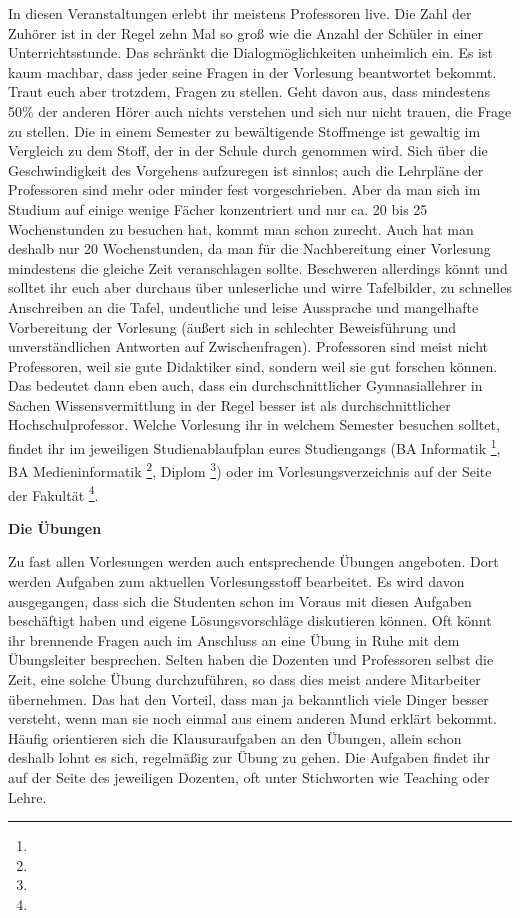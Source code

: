 In diesen Veranstaltungen erlebt ihr meistens Professoren live.
Die Zahl der Zuhörer ist in der Regel zehn Mal so groß wie die Anzahl der Schüler in einer Unterrichtsstunde.
Das schränkt die Dialogmöglichkeiten unheimlich ein.
Es ist kaum machbar, dass jeder seine Fragen in der Vorlesung beantwortet bekommt.
Traut euch aber trotzdem, Fragen zu stellen.
Geht davon aus, dass mindestens 50\% der anderen Hörer auch nichts verstehen und sich nur nicht trauen, die Frage zu stellen.
Die in einem Semester zu bewältigende Stoffmenge ist gewaltig im Vergleich zu dem Stoff, der in der Schule durch genommen wird.
Sich über die Geschwindigkeit des Vorgehens aufzuregen ist sinnlos; auch die Lehrpläne der Professoren sind mehr oder minder fest vorgeschrieben.
Aber da man sich im Studium auf einige wenige Fächer konzentriert und nur ca. 20 bis 25 Wochenstunden zu besuchen hat, kommt man schon zurecht.
Auch hat man deshalb nur 20 Wochenstunden, da man für die Nachbereitung einer Vorlesung mindestens die gleiche Zeit veranschlagen sollte.
Beschweren allerdings könnt und solltet ihr euch aber durchaus über unleserliche und wirre Tafelbilder, zu schnelles Anschreiben an die Tafel, undeutliche und leise Aussprache und mangelhafte Vorbereitung der Vorlesung (äußert sich in schlechter Beweisführung und unverständlichen Antworten auf Zwischenfragen).
Professoren sind meist nicht Professoren, weil sie gute Didaktiker sind, sondern weil sie gut forschen können.
Das bedeutet dann eben auch, dass ein durchschnittlicher Gymnasiallehrer in Sachen Wissensvermittlung in der Regel besser ist als durchschnittlicher Hochschulprofessor.
Welche Vorlesung ihr in welchem Semester besuchen solltet, findet ihr im jeweiligen Studienablaufplan eures Studiengangs (BA Informatik \footnote{}, BA Medieninformatik \footnote{}, Diplom \footnote{}) oder im Vorlesungsverzeichnis auf der Seite der Fakultät \footnote{}.

\textbf{Die Übungen}

Zu fast allen Vorlesungen werden auch entsprechende Übungen angeboten.
Dort werden Aufgaben zum aktuellen Vorlesungsstoff bearbeitet.
Es wird davon ausgegangen, dass sich die Studenten schon im Voraus mit diesen Aufgaben beschäftigt haben und eigene Lösungsvorschläge diskutieren können.
Oft könnt ihr brennende Fragen auch im Anschluss an eine Übung in Ruhe mit dem Übungsleiter besprechen.
Selten haben die Dozenten und Professoren selbst die Zeit, eine solche Übung durchzuführen, so dass dies meist andere Mitarbeiter übernehmen.
Das hat den Vorteil, dass man ja bekanntlich viele Dinger besser versteht, wenn man sie noch einmal aus einem anderen Mund erklärt bekommt.
Häufig orientieren sich die Klausuraufgaben an den Übungen, allein schon deshalb lohnt es sich, regelmäßig zur Übung zu gehen.
Die Aufgaben findet ihr auf der Seite des jeweiligen Dozenten, oft unter Stichworten wie Teaching oder Lehre.

